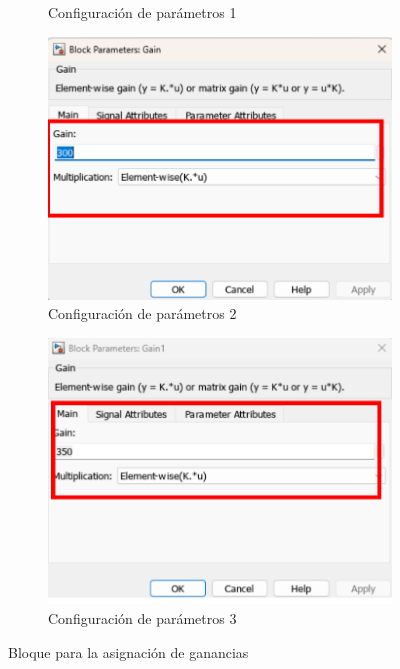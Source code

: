 \begin{figure}[htbp]
\begin{subfigure}[b]{0.45\textwidth}
        \caption{Configuración de parámetros 1}
        \label{fig:parametros_gain_01}
    \end{subfigure}
    \hfill
    \begin{subfigure}[b]{0.45\textwidth}
        \centering
        \includegraphics[width=\textwidth]{fig/Capitulo5/Caso_de_estudio_PID/config_gain_300.pdf}
        \caption{Configuración de parámetros 2}
        \label{fig:parametros_gain_02}
    \end{subfigure}
    \hfill
    \begin{subfigure}[b]{0.45\textwidth}
        \centering
        \includegraphics[width=\textwidth]{fig/Capitulo5/Caso_de_estudio_PID/config_gain_350.pdf}
        \caption{Configuración de parámetros 3}
        \label{fig:parametros_gain_03}
    \end{subfigure}

    \caption{Bloque para la asignación de ganancias}
    \label{fig:arreglo_gain}
\end{figure}

